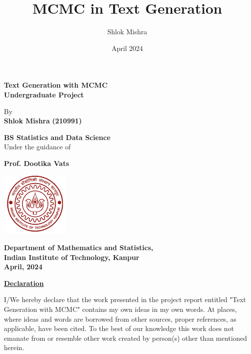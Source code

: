\documentclass{article}
\title{MCMC in Text Generation}
\author{Shlok Mishra}
\date{April 2024}
\begin{document}
\doublespacing
\thispagestyle{empty}
\begin{center}
    \textbf{ \Large
        Text Generation with MCMC\\
    }
    \vspace*{1cm}
    \textbf{Undergraduate Project}
    \vspace*{1cm}

    By \\
    \vspace*{1cm}
    \textbf{Shlok Mishra}
    \textbf{(210991)}

    \textbf{BS Statistics and Data Science}
    \vspace*{1cm} \\
    Under the guidance of

    \textbf{Prof. Dootika Vats}
    \vspace*{1cm}
    \begin{center}
        \includegraphics[width=0.25\textwidth]{iitklogo.jpg}
    \end{center}

    \textbf{Department of Mathematics and Statistics, \\ Indian Institute of Technology, Kanpur \\ April, 2024}
\end{center}

\newpage
\onehalfspacing
\thispagestyle{empty}
\vspace*{2cm}
\begin{center}
    \textbf{\underline{Declaration}}
\end{center}
\vspace*{1cm}
{I/We hereby declare that the work presented in the project report entitled "Text Generation with MCMC" contains my own ideas in my own words. At places, where ideas and words are borrowed from other sources, proper references, as applicable, have been cited. To the
    best of our knowledge this work does not emanate from or resemble other work created
    by person(s) other than mentioned herein.}
\vspace*{2cm}
\end{document}
